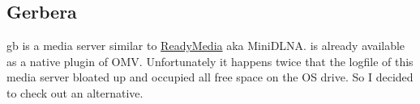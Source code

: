 

\subsection{Gerbera}

\gls{gb} is a media server similar to \href{https://sourceforge.net/projects/minidlna/}{ReadyMedia}
aka MiniDLNA.  is already available as a native
plugin of \gls{OMV}. Unfortunately it happens twice that the logfile of this
media server bloated up and occupied all free space on the OS drive. So I
decided to check out an alternative. 
